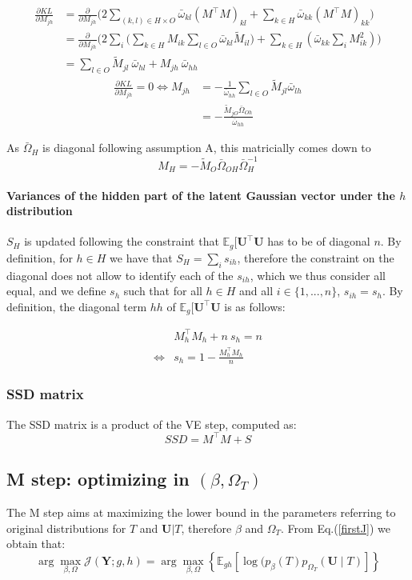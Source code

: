 \documentclass[11pt,a4paper]{article}
\newcommand{\argmax}{\arg\!\max}
\newcommand{\Ybf}{\boldsymbol{Y}}
\newcommand{\Ubf}{\boldsymbol{U}}
\newcommand{\Esp}{\mathds{E}}
\begin{document}
\begin{align*}
\frac{\partial KL}{\partial M_{jh}} &= \frac{\partial}{\partial M_{jh}}\Big(2\sum_{ (k, l) \in H\times O}\bar{\omega}_{kl} (M^\intercal M)_{kl} + \sum_{k\in H} \bar{\omega}_{kk} (M^\intercal M)_{kk}\Big)\\
&=\frac{\partial}{\partial M_{jh}}\Big(2\sum_i \Big(\sum_{k\in H} M_{ik}\sum_{l\in O}\bar{\omega}_{kl} \widetilde{M}_{il}\Big) + \sum_{k\in H} (\bar{\omega}_{kk} \sum_i M_{ik}^2)\Big)\\
&=   \sum_{l \in O } \widetilde{M}_{jl}\: \bar{\omega}_{hl} + M_{jh} \:\bar{\omega}_{hh}
\end{align*}
\begin{align*}
\frac{\partial KL}{\partial M_{jh}}  = 0\iff M_{jh} &= -\frac{1}{\bar{\omega}_{hh}} \sum_{l\in O} \widetilde{M}_{jl}\bar{\omega}_{lh}\\
&=-\frac{\widetilde{M}_{jO} \bar{\Omega}_{Oh}}{\bar{\omega}_{hh}}
\end{align*}

As $\bar{\Omega}_H$ is diagonal following assumption A, this  matricially comes down to
$$\boxed{ M_H = -\widetilde{M}_O\bar{\Omega}_{OH} \bar{\Omega}_H^{-1}}$$


\paragraph{Variances of the hidden part of the latent Gaussian vector under the $h$ distribution \\}
$S_H$ is updated following the constraint that $\Esp_g[\Ubf^\intercal \Ubf$ has to be of diagonal $n$. By definition, for $h\in H$ we have that $S_H = \sum_i s_{ih}$, therefore the constraint on the diagonal  does not allow to identify each of the $s_{ih}$, which we thus consider all equal, and we define $s_h$ such that for all $ h\in H$ and all $ i\in \{1,...,n\}$, $s_{ih} = s_h$.  By definition, the diagonal term $hh$ of $\Esp_g[\Ubf^\intercal \Ubf$ is as follows:

\begin{align*}
& M_h^\intercal M_h+ n\:s_h = n\\
\iff &\boxed{s_h = 1-\frac{ M_h^\intercal M_h}{n}}
\end{align*}
\subsubsection{SSD matrix}
The SSD matrix is a product of the VE step, computed as:
$$ SSD = M^\intercal M+ S$$
 \subsection{M step: optimizing in $(\beta, \Omega_T)$}
 The M step aims at maximizing the lower bound in the parameters referring to original distributions for $T$ and $\Ubf|T$, therefore $\beta$ and $\Omega_T$. From Eq.(\ref{firstJ}) we obtain that: 
$$ \argmax_{\beta, \Omega} \mathcal{J}(\Ybf ; g,h) =\argmax_{\beta, \Omega} \left\{ \Esp_{gh} [\log (p_\beta(T)p_{\Omega_T}(\Ubf\mid T) ]\right\} $$
\end{document}
